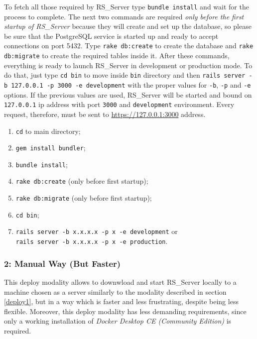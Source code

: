 \documentclass[a4paper, english]{article}
\newcounter{subsubsubsection}[subsubsection]
\begin{document}
To fetch all those required by RS\_Server type \verb|bundle install| and wait for the process to complete. The next two commands are required \emph{only before the first startup of RS\_Server} because they will create and set up the database, so please be sure that the PostgreSQL service is started up and ready to accept connections on port 5432. Type \verb|rake db:create| to create the database and \verb|rake db:migrate| to create the required tables inside it. After these commands, everything is ready to launch RS\_Server in development or production mode. To do that, just type \verb|cd bin| to move inside \verb|bin| directory and then \verb|rails server -b 127.0.0.1 -p 3000 -e development| with the proper values for \verb|-b|, \verb|-p| and \verb|-e| options. If the previous values are used, RS\_Server will be started and bound on \verb|127.0.0.1| ip address with port \verb|3000| and \verb|development| environment. Every request, therefore, must be sent to \url{https://127.0.0.1:3000} address.


\begin{enumerate}
\item \verb|cd| to main directory;
\item \verb|gem install bundler|;
\item \verb|bundle install|;
\item \verb|rake db:create| (only before first startup);
\item \verb|rake db:migrate| (only before first startup);
\item \verb|cd bin|;
\item \verb|rails server -b x.x.x.x -p x -e development| or\\ \verb|rails server -b x.x.x.x -p x -e production|.
\end{enumerate}

\subsubsection{2: Manual Way (But Faster)}

This deploy modality allows to downwload and start RS\_Server locally to a machine chosen as a server similarly to the modality described in section \ref{deploy1}, but in a way which is faster and less frustrating, despite being less flexible. Moreover, this deploy modality has less demanding requirements, since only a working installation of \emph{Docker Desktop CE (Community Edition)} is required.
\end{document}
